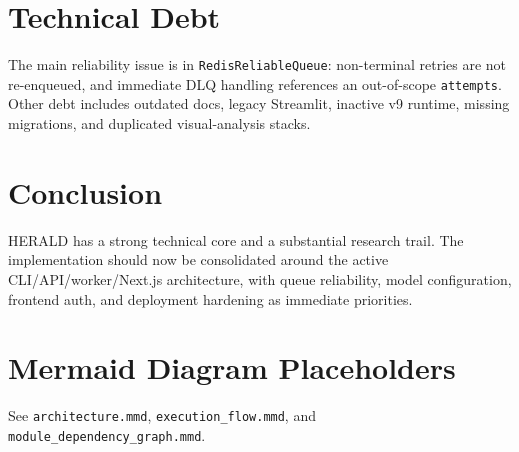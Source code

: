 \documentclass[11pt]{article}
\begin{document}
\section{Technical Debt}
The main reliability issue is in \texttt{RedisReliableQueue}: non-terminal retries are not re-enqueued, and immediate DLQ handling references an out-of-scope \texttt{attempts}. Other debt includes outdated docs, legacy Streamlit, inactive v9 runtime, missing migrations, and duplicated visual-analysis stacks.

\section{Conclusion}
HERALD has a strong technical core and a substantial research trail. The implementation should now be consolidated around the active CLI/API/worker/Next.js architecture, with queue reliability, model configuration, frontend auth, and deployment hardening as immediate priorities.

\appendix
\section{Mermaid Diagram Placeholders}
See \texttt{architecture.mmd}, \texttt{execution\_flow.mmd}, and \texttt{module\_dependency\_graph.mmd}.
\end{document}
